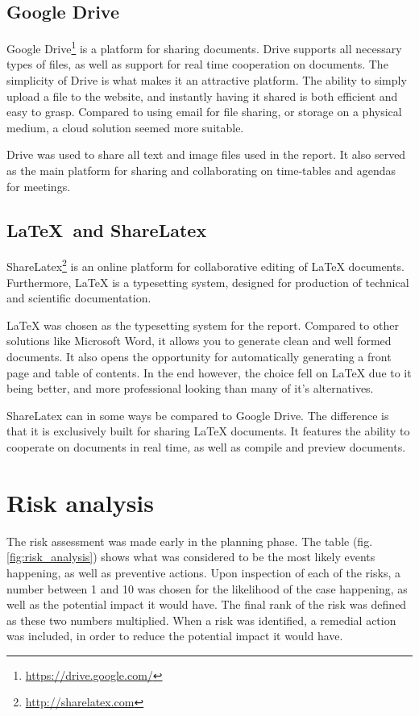 \subsection{Google Drive}
\label{subsec:prestudies-tools-google_drive}

Google Drive\footnote{\url{https://drive.google.com/}} is a platform for sharing documents. Drive supports all necessary types of files, as well as support for real time cooperation on documents. The simplicity of Drive is what makes it an attractive platform. The ability to simply upload a file to the website, and instantly having it shared is both efficient and easy to grasp. Compared to using email for file sharing, or storage on a physical medium, a cloud solution seemed more suitable. 

Drive was used to share all text and image files used in the report. It also served as the main platform for sharing and collaborating on time-tables and agendas for meetings.

\subsection{LaTeX\ and ShareLatex}
\label{subsec:prestudies-tools-latex_and_sharelatex}

ShareLatex\footnote{\url{http://sharelatex.com}} is an online platform for collaborative editing of LaTeX documents. Furthermore, LaTeX is a typesetting system, designed for production of technical and scientific documentation.

LaTeX was chosen as the typesetting system for the report. Compared to other solutions like Microsoft Word, it allows you to generate clean and well formed documents. It also opens the opportunity for automatically generating a front page and table of contents. In the end however, the choice fell on LaTeX due to it being better, and more professional looking than many of it's alternatives.

ShareLatex can in some ways be compared to Google Drive. The difference is that it is exclusively built for sharing LaTeX documents. It features the ability to cooperate on documents in real time, as well as compile and preview documents.

\section{Risk analysis}
\label{sec:prestudies-risk_analysis}

The risk assessment was made early in the planning phase. The table (fig. \ref{fig:risk_analysis}) shows what was considered to be the most likely events happening, as well as preventive actions. Upon inspection of each of the risks, a number between 1 and 10 was chosen for the likelihood of the case happening, as well as the potential impact it would have. The final rank of the risk was defined as these two numbers multiplied. When a risk was identified, a remedial action was included, in order to reduce the potential impact it would have.

